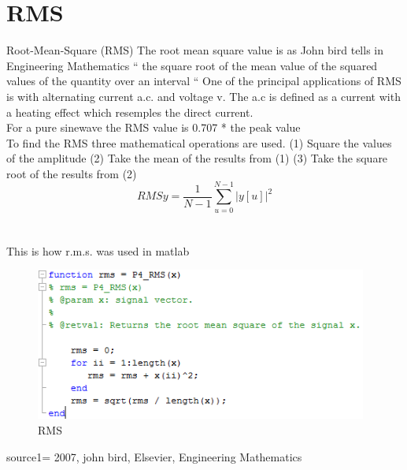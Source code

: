 \section{RMS}
Root-Mean-Square (RMS)
The root mean square value is as John bird tells in Engineering Mathematics \cite{Bird2007
} “ the square root of the mean value of the squared values of the quantity over an interval “
One of the principal applications of RMS is with alternating current a.c. and voltage v. The a.c is defined as a current with a heating effect which resemples the direct current. \cite{Bird2007}
\\
For a pure sinewave the RMS value is 0.707 * the peak value
\\
To find the RMS three mathematical operations are used.
(1)	Square the values of the amplitude
(2)	Take the mean of the results from (1)
(3)	Take the square root of the results from (2)
\begin{equation}\label{eq:RMS formular}
RMSy = \frac{1}{N-1}\sum_{u=0}^{N-1}|y[u]|^2
\end{equation}
\\

\\
This is how r.m.s. was used in matlab
\begin{figure}
\begin{center}
\includegraphics[height=5cm]{fig/RMS_matlabCode.png}
\caption{RMS}
\end{center}
\end{figure}

source1= 2007, john bird, Elsevier, Engineering Mathematics